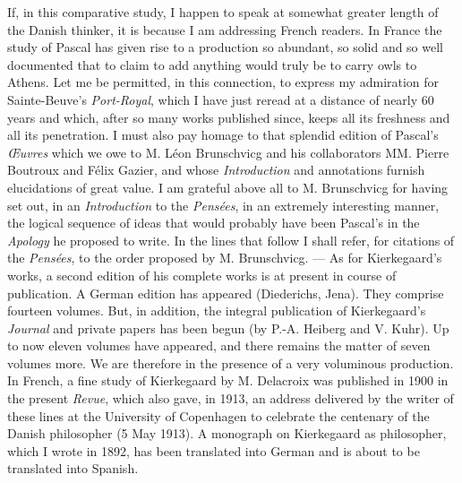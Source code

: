 \documentclass[12pt,a4paper]{article}
\newcommand{\opage}[1]{\marginnote{\footnotesize\textit{[#1]}}}
\begin{document}
If, in this comparative study, I happen to speak at somewhat greater length of
the Danish thinker, it is because I am addressing French readers. In France the
study of Pascal has given rise to a production so abundant, so solid and so
well documented that to claim to add anything would truly be to carry owls to
Athens. Let me be permitted, in this connection, to express my admiration for
Sainte-Beuve's \emph{Port-Royal}, which I have just reread at a distance of
nearly 60 years and which, after so many works published since, keeps all its
freshness and all its penetration. I must also pay homage to that splendid
edition of Pascal's \emph{Œuvres} which we owe to M. Léon Brunschvicg and his
collaborators MM. Pierre Boutroux and Félix Gazier, and whose
\emph{Introduction} and annotations furnish elucidations of great value. I am
grateful above all to M. Brunschvicg for having set out, in an
\emph{Introduction} to the \emph{Pensées}, in an extremely interesting manner,
the logical sequence of ideas that would probably have been Pascal's in the
\emph{Apology} he proposed to write. In the lines that follow
\opage{224}I shall refer, for citations of the \emph{Pensées}, to the order proposed by
M. Brunschvicg. --- As for Kierkegaard's works, a second edition of his
complete works is at present in course of publication. A German edition has
appeared (Diederichs, Jena). They comprise fourteen volumes. But, in addition,
the integral publication of Kierkegaard's \emph{Journal} and private papers has
been begun (by P.-A. Heiberg and V. Kuhr). Up to now eleven volumes have
appeared, and there remains the matter of seven volumes more. We are therefore
in the presence of a very voluminous production. In French, a fine study of
Kierkegaard by M. Delacroix was published in 1900 in the present \emph{Revue},
which also gave, in 1913, an address delivered by the writer of these lines at
the University of Copenhagen to celebrate the centenary of the Danish
philosopher (5 May 1913). A monograph on Kierkegaard as philosopher, which I
wrote in 1892, has been translated into German and is about to be translated
into Spanish.
\end{document}
